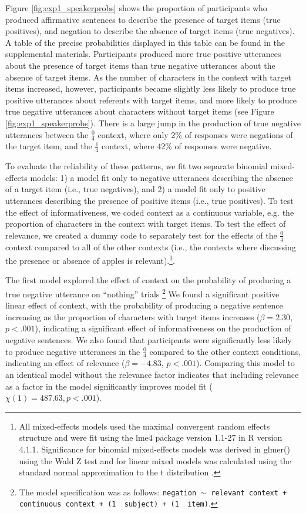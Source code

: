 \documentclass[man, floatsintext, noapacite]{apa6}
\begin{document}
Figure \ref{fig:exp1_speakerprobs} shows the proportion of participants who produced affirmative sentences to describe the presence of target items (true positives), and negation to describe the absence of target items (true negatives). A table of the precise probabilities displayed in this table can be found in the supplemental materials. Participants produced more true positive utterances about the presence of target items than true negative utterances about the absence of target items. As the number of characters in the context with target items increased, however, participants became slightly less likely to produce true positive utterances about referents with target items, and more likely to produce true negative utterances about characters without target items (see Figure \ref{fig:exp1_speakerprobs}). There is a large jump in the production of true negative utterances between the $\frac{0}{4}$ context, where only 2\% of responses were negations of the target item, and the $\frac{1}{4}$ context, where 42\% of responses were negative. 

To evaluate the reliability of these patterns, we fit two separate binomial mixed-effects models: 1) a model fit only to negative utterances describing the absence of a target item (i.e., true negatives), and 2) a model fit only to positive utterances describing the presence of positive items (i.e., true positives). To test the effect of informativeness, we coded context as a continuous variable, e.g. the proportion of characters in the context with target items. To test the effect of relevance, we created a dummy code to separately test for the effects of the  $\frac{0}{4}$ context compared to all of the other contexts (i.e., the contexts where discussing the presence or absence of apples is relevant).\footnote{All mixed-effects models used the maximal convergent random effects structure \cite{barr2013} and were fit using the lme4 package version 1.1-27 in R version 4.1.1. Significance for binomial mixed-effects models was derived in glmer() using the Wald Z test and for linear mixed models was calculated using the standard normal approximation to the t distribution \cite{barr2013}.}.

The first model explored the effect of context on the probability of producing a true negative utterance on ``nothing'' trials \footnote{The model specification was as follows: \texttt{negation $\sim$  relevant context + continuous context + (1~\textbar~subject) +  (1~\textbar~item)}.} We found a significant positive linear effect of context, with the probability of producing a negative sentence increasing as the proportion of characters with target items increases ($\beta= 2.30$, $p< .001$), indicating a significant effect of informativeness on the production of negative sentences. We also found that participants were significantly less likely to produce negative utterances in the $\frac{0}{4}$ compared to the other context conditions, indicating an effect of relevance ($\beta= -4.83$, $p< .001$). Comparing this model to an identical model without the relevance factor indicates that including relevance as a factor in the model significantly improves model fit ($\chi(1)= 487.63, p < .001$). 
\end{document}
